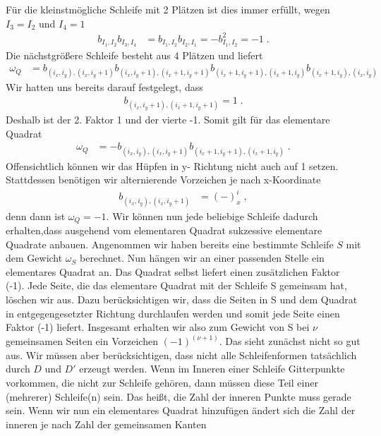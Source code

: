 Für die kleinstmögliche Schleife mit 2 Plätzen ist dies immer erfüllt, wegen $I_3=I_2$ und $I_4=1$
\begin{align*}
    b_{I_1,I_2}b_{I_3,I_4} &=    b_{I_1,I_2}b_{I_2,I_1}= -b_{I_1,I_2}^2 =-1\;.
\end{align*}
Die nächstgrößere Schleife  besteht aus 4 Plätzen und liefert
\begin{align*}
   \omega_Q &=  b_{(i_x,i_y),(i_x,i_y+1)} b_{(i_x,i_y+1),(i_x+1,i_y+1)}b_{(i_x+1,i_y+1),(i_x+1,i_y)}b_{(i_x+1,i_y),(i_x,i_y)}
\end{align*}
Wir hatten uns bereits darauf festgelegt, dass
\begin{align*}
    b_{(i_x,i_y+1),(i_x+1,i_y+1)} = 1\; .
\end{align*}
Deshalb ist der 2. Faktor 1 und der vierte -1. Somit gilt für das elementare Quadrat
\begin{align*}
    \omega_Q &= - b_{(i_x,i_y),(i_x,i_y+1)} b_{(i_x+1,i_y+1),(i_x+1,i_y)}\;.
\end{align*}
Offensichtlich können wir das Hüpfen in y- Richtung nicht auch auf 1 setzen. Stattdessen benötigen wir alternierende Vorzeichen je nach x-Koordinate
\begin{align}\label{eq:b_y}
    b_{(i_x,i_y),(i_x,i_y+1)} &= (-)^i_x\;,
\end{align}
denn dann ist  $\omega_Q=-1$. Wir können nun jede beliebige Schleife dadurch erhalten,dass ausgehend vom elementaren Quadrat sukzessive elementare Quadrate anbauen.
Angenommen wir haben bereits eine bestimmte Schleife $S$ mit dem Gewicht $\omega_S$ berechnet. Nun hängen wir an einer passenden Stelle ein elementares Quadrat an.
Das Quadrat selbst liefert einen zusätzlichen Faktor (-1). Jede Seite, die das elementare Quadrat mit der Schleife S gemeinsam hat, löschen wir aus. Dazu berücksichtigen wir, 
dass die Seiten in S und dem Quadrat in entgegengesetzter Richtung durchlaufen werden und somit jede Seite einen Faktor (-1) liefert. Insgesamt erhalten wir also zum Gewicht von 
S bei $\nu$ gemeinsamen Seiten ein Vorzeichen $(-1)^{(\nu+1)}$. Das sieht zunächst nicht so gut aus. Wir müssen aber berücksichtigen, dass nicht alle Schleifenformen tatsächlich 
durch $D$ und $D'$ erzeugt werden. Wenn im Inneren einer Schleife Gitterpunkte vorkommen, die nicht zur Schleife gehören, dann müssen diese Teil einer (mehrerer) Schleife(n)
sein. Das heißt, die Zahl der inneren Punkte muss gerade sein. Wenn wir nun ein elementares Quadrat hinzufügen ändert sich die Zahl der inneren je nach Zahl der gemeinsamen Kanten

